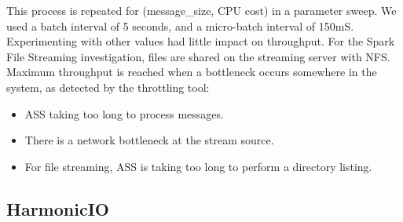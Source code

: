 \documentclass[conference]{IEEEtran}
\begin{document}


This process is repeated for (message\_size, CPU cost) in a parameter sweep. 
We used a batch interval of 5 seconds, and a micro-batch interval of 150mS. Experimenting with other values had little impact on throughput. For the Spark File Streaming investigation, files are shared on the streaming server with NFS. %
Maximum throughput is reached when a bottleneck occurs somewhere in the system, as detected by the throttling tool:
\begin{itemize}
\item ASS taking too long to process messages.%
\item There is a network bottleneck at the stream source.%
\item For file streaming, ASS is taking too long to perform a directory listing.%
\end{itemize}





\subsection{HarmonicIO}
\end{document}
